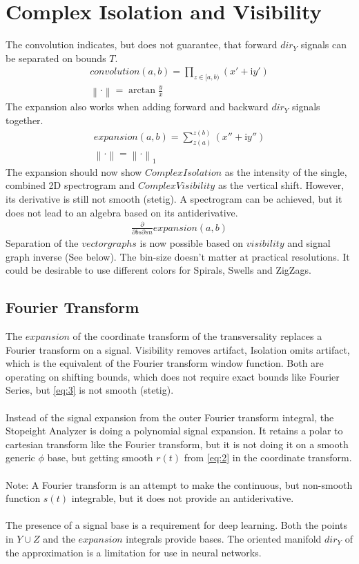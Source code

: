 \documentclass{report}
\newcommand\norm[1]{\left\lVert#1\right\rVert}
\begin{document}
\section{Complex Isolation and Visibility}
The convolution indicates, but does not guarantee, that forward $dir_{Y}$ signals can be separated on bounds $T$.
\begin{align}
convolution(a,b)=\prod \limits _{z \in [a,b)} (x'+\mathrm{i}y')\\
\norm{\cdot}=\arctan \frac{y}{x}
\end{align}
The expansion also works when adding forward and backward $dir_{Y}$ signals together.
\begin{align}
expansion(a,b)=\sum \limits _{z(a)}^{z(b)} (x''+\mathrm{i}y'')\\
\norm{\cdot}=\norm{\cdot}_1
\end{align}
The expansion should now show $Complex Isolation$ as the intensity of the single, combined 2D spectrogram and $Complex Visibility$ as the vertical shift. However, its derivative is still not smooth (stetig). A spectrogram can be achieved, but it does not lead to an algebra based on its antiderivative.
\begin{align}
\frac{\partial}{\partial bs\partial sn} expansion(a,b)\label{eq:3}
\end{align}
Separation of the $vectorgraphs$ is now possible based on $visibility$ and signal graph inverse (See below). The bin-size doesn't matter at practical resolutions. It could be desirable to use different colors for Spirals, Swells and ZigZags.

\subsection*{Fourier Transform}
The $expansion$ of the coordinate transform of the transversality replaces a Fourier transform on a signal. Visibility removes artifact, Isolation omits artifact, which is the equivalent of the Fourier transform window function. Both are operating on shifting bounds, which does not require exact bounds like Fourier Series, but \eqref{eq:3} is not smooth (stetig).\\\\
Instead of the signal expansion from the outer Fourier transform integral, the Stopeight Analyzer is doing a polynomial signal expansion. It retains a polar to cartesian transform like the Fourier transform, but it is not doing it on a smooth generic $\phi$ base, but getting smooth $r(t)$ from \eqref{eq:2} in the coordinate transform.\\\\
Note: A Fourier transform is an attempt to make the continuous, but non-smooth function $s(t)$ integrable, but it does not provide an antiderivative.\\\\
The presence of a signal base is a requirement for deep learning. Both the points in $Y\cup Z$ and the $expansion$ integrals provide bases. The oriented manifold $dir_{Y}$ of the approximation is a limitation for use in neural networks.
\end{document}
